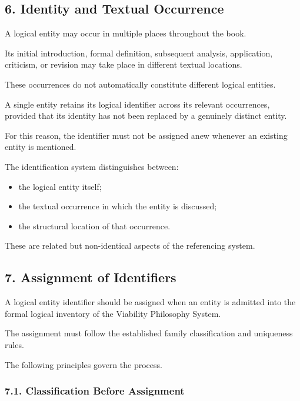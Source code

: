 \subsection*{6. Identity and Textual Occurrence}

A logical entity may occur in multiple
places throughout the book.

Its initial introduction, formal
definition, subsequent analysis,
application, criticism, or revision
may take place in different textual
locations.

These occurrences do not automatically
constitute different logical entities.

A single entity retains its logical
identifier across its relevant
occurrences, provided that its identity
has not been replaced by a genuinely
distinct entity.

For this reason, the identifier must
not be assigned anew whenever an
existing entity is mentioned.

The identification system distinguishes
between:

\begin{itemize}
    \item the logical entity itself;
    \item the textual occurrence in which
    the entity is discussed;
    \item the structural location of
    that occurrence.
\end{itemize}

These are related but non-identical
aspects of the referencing system.


\subsection*{7. Assignment of Identifiers}

A logical entity identifier should
be assigned when an entity is admitted
into the formal logical inventory
of the Viability Philosophy System.

The assignment must follow the
established family classification
and uniqueness rules.

The following principles govern
the process.

\subsubsection*{7.1. Classification Before Assignment}

